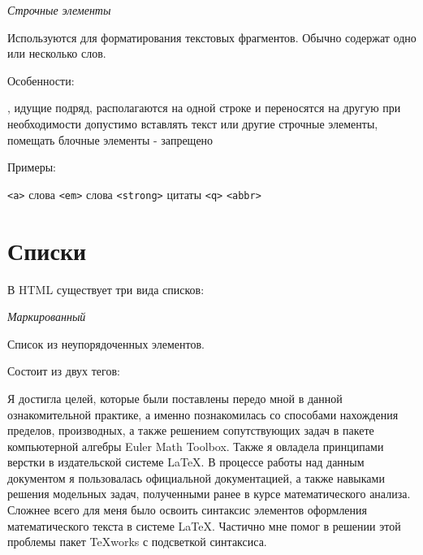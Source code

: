 \documentclass[14pt]{extreport}
\begin{document}
\emph{Строчные элементы}

Используются для форматирования текстовых фрагментов. Обычно содержат одно или несколько слов.

Особенности:
\begin{itemize}
, идущие подряд, располагаются на одной строке и переносятся на другую при необходимости
 допустимо вставлять текст или другие строчные элементы, помещать блочные элементы - запрещено
\end{itemize}

Примеры:
\begin{itemize}
 \texttt{<a>}
 слова \texttt{<em>}
 слова \texttt{<strong>}
 цитаты \texttt{<q>}
 \texttt{<abbr>}
\end{itemize}




\section{Списки}

В HTML существует три вида списков:

\emph{Маркированный}

Список из неупорядоченных элементов.

Состоит из двух тегов:






\conclusions

Я достигла целей, которые были поставлены передо мной в данной ознакомительной практике, а именно познакомилась со способами нахождения пределов, производных, а также решением сопутствующих задач в пакете компьютерной алгебры Euler Math Toolbox. Также я овладела принципами верстки в издательской системе LaTeX.  В процессе работы над данным документом я пользовалась официальной документацией, а также навыками решения модельных задач, полученными ранее в курсе математического  анализа. Сложнее всего для меня было освоить синтаксис элементов оформления математического текста в системе LaTeX. Частично мне помог в решении этой проблемы пакет TeXworks с подсветкой синтаксиса.  
\end{document}

